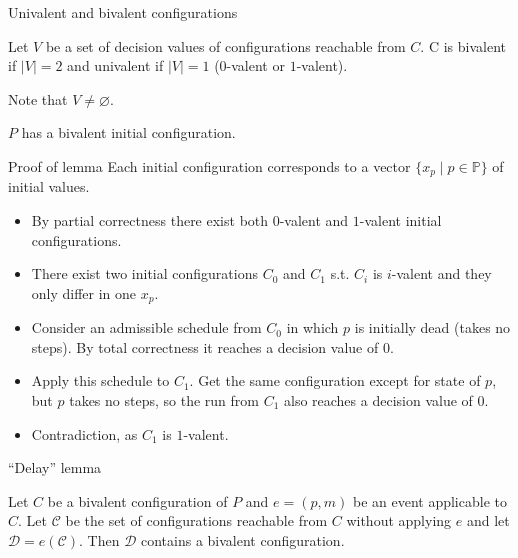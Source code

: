 \documentclass{beamer}
\begin{document}
\begin{frame}{Univalent and bivalent configurations}
  \begin{definition}
    Let $V$ be a set of decision values of configurations reachable from $C$. C is \alert{bivalent} if $|V| = 2$ and \alert{univalent} if $|V| = 1$ ($0$-valent or $1$-valent).

    Note that $V \ne \varnothing$.
  \end{definition}
  \begin{lemma}
    $P$ has a bivalent initial configuration.
  \end{lemma}
\end{frame}

\begin{frame}{Proof of lemma}
Each initial configuration corresponds to a vector $\{ x_p \mid p \in \mathbb{P} \}$ of initial values.
  \begin{itemize}
    \item By partial correctness there exist both $0$-valent and $1$-valent initial configurations.
    \item There exist two initial configurations $C_0$ and $C_1$ s.t. $C_i$ is $i$-valent and they only differ in one $x_p$.
    \item Consider an admissible schedule from $C_0$ in which $p$ is initially dead (takes no steps). By total correctness it reaches a decision value of $0$.
    \item Apply this schedule to $C_1$. Get the same configuration except for state of $p$, but $p$ takes no steps, so the run from $C_1$ also reaches a decision value of $0$.
    \item Contradiction, as $C_1$ is $1$-valent.
  \end{itemize}
\end{frame}

\begin{frame}{``Delay'' lemma}
  \begin{lemma}
    Let $C$ be a bivalent configuration of $P$ and $e=(p,m)$ be an event applicable to $C$. Let $\mathcal{C}$ be the set of configurations reachable from $C$ without applying $e$ and let $\mathcal{D} = e(\mathcal{C})$. Then $\mathcal{D}$ contains a bivalent configuration.
  \end{lemma}
\end{frame}
\end{document}
